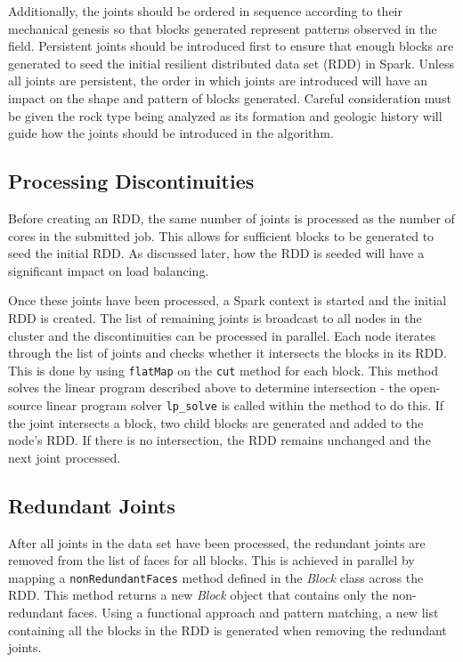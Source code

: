 Additionally, the joints should be ordered in sequence according to their mechanical genesis so that blocks generated represent patterns observed in the field. Persistent joints should be introduced first to ensure that enough blocks are generated to seed the initial resilient distributed data set (RDD) in Spark. Unless all joints are persistent, the order in which joints are introduced will have an impact on the shape and pattern of blocks generated. Careful consideration must be given the rock type being analyzed as its formation and geologic history will guide how the joints should be introduced in the algorithm. \par

\subsection{Processing Discontinuities}
Before creating an RDD, the same number of joints is processed as the number of cores in the submitted job. This allows for sufficient blocks to be generated to seed the initial RDD. As discussed later, how the RDD is seeded will have a significant impact on load balancing. \par

Once these joints have been processed, a Spark context is started and the initial RDD is created. The list of remaining joints is broadcast to all nodes in the cluster and the discontinuities can be processed in parallel. Each node iterates through the list of joints and checks whether it intersects the blocks in its RDD. This is done by using \texttt{flatMap} on the \texttt{cut} method for each block. This method solves the linear program described above to determine intersection - the open-source linear program solver \texttt{lp\_solve} \cite{lpsolve} is called within the method to do this. If the joint intersects a block, two child blocks are generated and added to the node's RDD. If there is no intersection, the RDD remains unchanged and the next joint processed.

\subsection{Redundant Joints}
After all joints in the data set have been processed, the redundant joints are removed from the list of faces for all blocks. This is achieved in parallel by mapping a \texttt{nonRedundantFaces} method defined in the \textit{Block} class across the RDD. This method returns a new \textit{Block} object that contains only the non-redundant faces. Using a functional approach and pattern matching, a new list containing all the blocks in the RDD is generated when removing the redundant joints.

